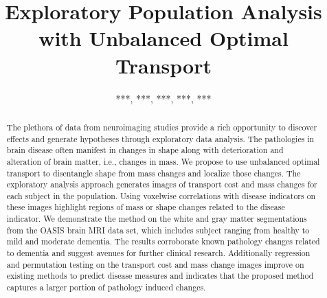 \documentclass{llncs}
\begin{document}
\title{Exploratory Population Analysis with Unbalanced Optimal Transport}

\author{***, ***, ***, ***, ***}%
\authorrunning{***}%
\institute{***\\%
\email{***@***.**}%
\and
***%
}

\maketitle              




\begin{abstract}
The plethora of data from neuroimaging studies provide a rich opportunity to
discover effects and generate hypotheses through exploratory data analysis. The
pathologies in brain disease often manifest in changes in shape along with
deterioration and alteration of brain matter, i.e., changes in mass. We propose
to use unbalanced optimal transport to disentangle shape from mass changes and
localize those changes. The exploratory analysis approach generates images of
transport cost and mass changes for each subject in the population.  Using
voxelwise correlations with disease indicators on these images highlight
regions of mass or shape changes related to the disease indicator.  We
demonstrate the method on the white and gray matter segmentations from the
OASIS brain MRI data set, which includes subject ranging from healthy to mild
and moderate dementia. The results corroborate known pathology changes related
to dementia and suggest avenues for further clinical research. Additionally
regression and permutation testing on the transport cost and mass change images
improve on existing methods to predict disease measures and indicates that the
proposed method captures a larger portion of pathology induced changes.
\end{abstract}
\end{document}
